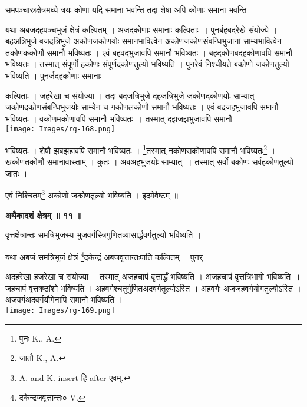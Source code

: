 \documentclass[11pt, openany]{book}
\begin{document}
{\ab समपञ्चास्रक्षेत्रमध्ये त्रयः कोणा यदि समाना भवन्ति
तदा शेषा अपि कोणाः समाना भवन्ति । }\\
\vspace{3mm}

 यथा अबजदहपञ्चभुजं क्षेत्रं कल्पितम् । अजदकोणाः समानाः कल्पिताः~। पुनर्बहबदरेखे संयोज्ये । बहअत्रिभुजे बजदत्रिभुजे अकोणजकोणयोः समानभावित्वेन अकोणजकोणसंबन्धिभुजानां साम्यभावित्वेन तकोणककोणौ समानौ भविष्यतः । एवं बहवदभुजावपि समानौ भविष्यतः । बहदकोणबदहकोणावपि समानौ भविष्यतः । तस्मात् संपूर्णो हकोणः संपूर्णदकोणतुल्यो भविष्यति । 
\newpage
पुनरेवं निश्चीयते बकोणो जकोणतुल्यो भविष्यति । पुनर्जदहकोणाः समानाः 
\begin{vwcol}[widths={0.7,0.3}, sep=.8cm, rule=0pt]
कल्पिताः । जहरेखा च
संयोज्या । तदा बदजत्रिभुजे दहजत्रिभुजे जकोणदकोणयोः साम्यात् जकोणदकोणसंबन्धिभुजयोः साम्येन च गकोणलकोणौ समानौ भविष्यतः । एवं बदजहभुजावपि समानौ भविष्यतः । वकोणमकोणावपि समानौ भविष्यतः~। तस्मात् दझजझभुजावपि समानौ \\
\noindent \texttt{[image: Images/rg-168.png]}  
\end{vwcol}
\vspace{-4mm} 

\noindent भविष्यतः । शेषौ झबझहावपि समानौ भविष्यतः । \renewcommand{\thefootnote}{१}\footnote{पुनः {\en K., A.}}तस्मात् नकोणसकोणावपि समानौ भविष्यतः\renewcommand{\thefootnote}{२}\footnote{जातौ {\en K., A.}} । खकोणतकोणौ समानावास्ताम् । कुतः । अबअहभुजयोः साम्यात्~। तस्मात् सर्वो बकोणः सर्वहकोणतुल्यो जातः ।\\
\vspace{5mm}

एवं निश्चितम्\renewcommand{\thefootnote}{३}\footnote{{\en A. and K. insert} हि {\en after} एवम्. } अकोणो जकोणतुल्यो भविष्यति । इदमेवेष्टम् ॥\\
\vspace{3mm}

\begin{center}
\textbf{\large अथैकादशं क्षेत्रम् ॥ ११ ॥ }
\end{center}
\vspace{5mm}

{\ab वृत्तक्षेत्रान्तः समत्रिभुजस्य भुजवर्गस्त्रिगुणितव्यासार्द्धवर्गतुल्यो भविष्यति । }\\
\vspace{3mm}

यथा अबजं समत्रिभुजं क्षेत्रं \renewcommand{\thefootnote}{४}\footnote{दकेन्द्रजवृत्तान्तः० {\en V.}}दकेन्द्रं अबजवृत्तान्तःपाति कल्पितम् । पुनर्
\begin{vwcol}[widths={0.7,0.3}, sep=.8cm, rule=0pt]
 अदहरेखा हजरेखा च
संयोज्या । तस्मात् अजहचापं वृत्तार्द्धं भविष्यति । अजहचापं वृत्तत्रिभागो भविष्यति~।
जहचापं वृत्तषष्ठांशो भविष्यति । अहवर्गश्चतुर्गुणितअदवर्गतुल्योऽस्ति । अहवर्गः अजजहवर्गयोगतुल्योऽस्ति । अजवर्गअदवर्गयौगेनापि समानो भविष्यति ।\\
\noindent \texttt{[image: Images/rg-169.png]}  
\end{vwcol}
\end{document}
